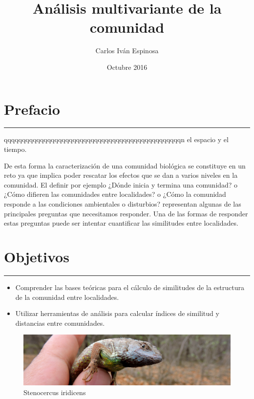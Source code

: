 \documentclass[]{book}
\title{Análisis multivariante de la comunidad}
\author{Carlos Iván Espinosa}
\date{Octubre 2016}
\begin{document}
\maketitle

{
\setcounter{tocdepth}{1}
\tableofcontents
}
\chapter*{Prefacio}\label{prefacio}

\begin{center}\rule{0.5\linewidth}{\linethickness}\end{center}

qqqqqqqqqqqqqqqqqqqqqqqqqqqqqqqqqqqqqqqqqqqqqqqqqn el espacio y el
tiempo.

De esta forma la caracterización de una comunidad biológica se
constituye en un reto ya que implica poder rescatar los efectos que se
dan a varios niveles en la comunidad. El definir por ejemplo ¿Dónde
inicia y termina una comunidad? o ¿Cómo difieren las comunidades entre
localidades? o ¿Cómo la comunidad responde a las condiciones ambientales
o disturbios? representan algunas de las principales preguntas que
necesitamos responder. Una de las formas de responder estas preguntas
puede ser intentar cuantificar las similitudes entre localidades.

\chapter*{Objetivos}\label{objetivos}

\begin{center}\rule{0.5\linewidth}{\linethickness}\end{center}

\begin{itemize}
\item
  Comprender las bases teóricas para el cálculo de similitudes de la
  estructura de la comunidad entre localidades.
\item
  Utilizar herramientas de análisis para calcular índices de similitud y
  distancias entre comunidades.
\end{itemize}

\begin{figure}[htbp]
\centering
\includegraphics{lagar.jpg}
\caption{Stenocercus iridicens}
\end{figure}
\end{document}
